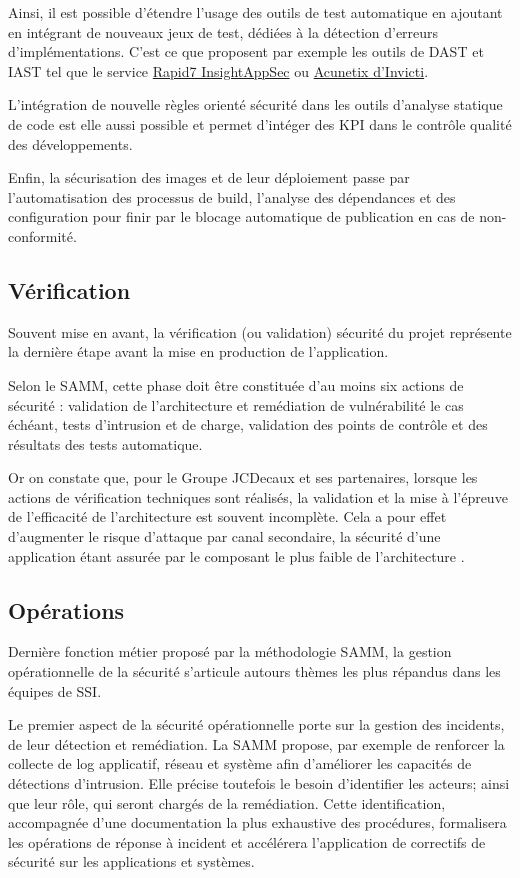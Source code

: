 Ainsi, il est possible d'étendre l'usage des outils de test automatique en ajoutant en intégrant de nouveaux jeux de 
test, dédiées à la détection d'erreurs d'implémentations.
C'est ce que proposent par exemple les outils de \ac{DAST}  et \ac{IAST} tel que le service 
\href{https://www.rapid7.com/products/insightappsec/}{Rapid7 InsightAppSec} ou \href{https://www.acunetix.com/}
{Acunetix d'Invicti}.

L'intégration de nouvelle règles orienté sécurité dans les outils d'analyse statique de code est elle aussi possible et 
permet d'intéger des \ac{KPI} dans le contrôle qualité des développements.

Enfin, la sécurisation des images et de leur déploiement passe par l'automatisation des processus de build, l'analyse 
des dépendances et des configuration pour finir par le blocage  automatique de publication en cas de non-conformité.

\subsection{Vérification}

Souvent mise en avant, la vérification (ou validation) sécurité du projet représente la dernière étape avant la mise en 
production de l'application. 

Selon le \ac{SAMM}, cette phase doit être constituée d'au moins six actions de sécurité : validation de l'architecture
et remédiation de vulnérabilité le cas échéant, tests d'intrusion et de charge, validation des points de contrôle et des
résultats des tests automatique.

Or on constate que, pour le Groupe JCDecaux et ses partenaires, lorsque les actions de vérification techniques sont
réalisés, la validation et la mise à l'épreuve de l'efficacité de l'architecture est souvent incomplète. Cela a pour 
effet d'augmenter le risque d'attaque par canal secondaire, la sécurité d'une application étant assurée par le composant
le plus faible de l'architecture .

\subsection{Opérations}
Dernière fonction métier proposé par la méthodologie \ac{SAMM}, la gestion opérationnelle de la sécurité s'articule 
autours thèmes les plus répandus dans les équipes de \ac{SSI}.

Le premier aspect de la sécurité opérationnelle porte sur la gestion des incidents, de leur détection et remédiation.
La \ac{SAMM} propose, par exemple de renforcer la collecte de log applicatif, réseau et système afin d'améliorer les 
capacités de détections d'intrusion. 
\newline Elle précise toutefois le besoin d'identifier les acteurs; ainsi que leur rôle, qui seront chargés de la 
remédiation. 
Cette identification, accompagnée d'une documentation la plus exhaustive des procédures, formalisera les opérations de 
réponse à incident et accélérera l'application de correctifs de sécurité sur les applications et systèmes.

